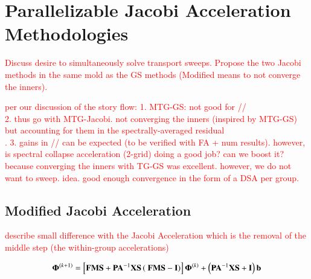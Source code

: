 \documentclass[preprint,10pt]{elsarticle}
\newcommand{\tcr}[1]{\textcolor{red}{#1}}
\begin{document}
\section{Parallelizable Jacobi Acceleration Methodologies} \label{sec::Jac}

\tcr{Discuss desire to simultaneously solve transport sweeps. Propose the two Jacobi methods in the same mold as the GS methods (Modified means to not converge the inners).}

\tcr
{
per our discussion of the story flow:
1. MTG-GS: not good for // \\
2. thus go with MTG-Jacobi. not converging the inners (inspired by MTG-GS) but accounting for them in the spectrally-averaged residual \\. 
3. gains in // can be expected (to be verified with FA + num results). however, is spectral collapse acceleration (2-grid) doing a good job? can we boost it? because converging the inners with TG-GS was excellent. however, we do not want to sweep. idea. good enough convergence in the form of a DSA per group.
}

\subsection{Modified Jacobi Acceleration}

\tcr{describe small difference with the Jacobi Acceleration which is the removal of the middle step (the within-group accelerations)}

\begin{equation}
\label{eq::DSA_MTG_Jac_op_update_simple}
 {\bf \Phi}^{(k+1)}= \left[ {\bf F}  {\bf M} {\bf S} +  {\bf P} {\bf A}^{-1}  {\bf X} {\bf S} \left(  \ {\bf F}  {\bf M} {\bf S}  -  {\bf I} \right) \right] {\bf \Phi}^{(k)} + \left(  {\bf P} {\bf A}^{-1}  {\bf X} {\bf S}  + {\bf I} \right) {\bf b}
\end{equation}

\end{document}
